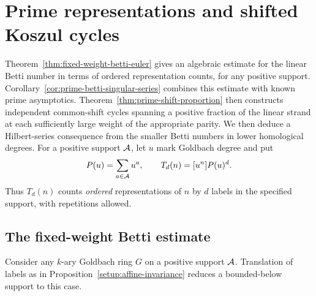 \section{Prime representations and shifted Koszul cycles}
\label{sec:betti-euler-shifts}

Theorem~\ref{thm:fixed-weight-betti-euler} gives an algebraic estimate
for the linear Betti number in terms of ordered representation counts,
for any positive support.
Corollary~\ref{cor:prime-betti-singular-series} combines this estimate
with known prime asymptotics. Theorem~\ref{thm:prime-shift-proportion}
then constructs independent common-shift cycles spanning a positive
fraction of the linear strand at each sufficiently large weight of
the appropriate parity. We then deduce a Hilbert-series consequence
from the smaller Betti numbers in lower homological degrees.
For a positive support $\mathcal A$, let $u$ mark Goldbach degree and put
\[
 P(u)=\sum_{a\in\mathcal A}u^a,\qquad T_d(n)=[u^n]P(u)^d .
\]
Thus $T_d(n)$ counts \emph{ordered} representations of $n$ by $d$
labels in the specified support, with repetitions allowed.

\subsection{The fixed-weight Betti estimate}
Consider any $k$-ary Goldbach ring $G$ on a positive support $\mathcal A$.
Translation of labels as in Proposition~\ref{setup:affine-invariance}
reduces a bounded-below support to this case.

